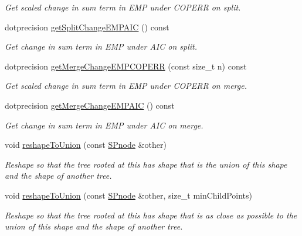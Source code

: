 \begin{DoxyCompactItemize}
\begin{DoxyCompactList}\small\item\em \-Get scaled change in sum term in \-E\-M\-P under \-C\-O\-P\-E\-R\-R on split. \end{DoxyCompactList}\item 
dotprecision \hyperlink{classsubpavings_1_1SPSnode_af75b1acec69e86469838524097fab408}{get\-Split\-Change\-E\-M\-P\-A\-I\-C} () const 
\begin{DoxyCompactList}\small\item\em \-Get change in sum term in \-E\-M\-P under \-A\-I\-C on split. \end{DoxyCompactList}\item 
dotprecision \hyperlink{classsubpavings_1_1SPSnode_a2c8cc31ffdb9c74b82cce176c8d14585}{get\-Merge\-Change\-E\-M\-P\-C\-O\-P\-E\-R\-R} (const size\-\_\-t n) const 
\begin{DoxyCompactList}\small\item\em \-Get scaled change in sum term in \-E\-M\-P under \-C\-O\-P\-E\-R\-R on merge. \end{DoxyCompactList}\item 
dotprecision \hyperlink{classsubpavings_1_1SPSnode_a42114089fcad779bec855496154ded19}{get\-Merge\-Change\-E\-M\-P\-A\-I\-C} () const 
\begin{DoxyCompactList}\small\item\em \-Get change in sum term in \-E\-M\-P under \-A\-I\-C on merge. \end{DoxyCompactList}\item 
void \hyperlink{classsubpavings_1_1SPSnode_ad128b1715d294a65c905579ab43890d2}{reshape\-To\-Union} (const \hyperlink{classsubpavings_1_1SPnode}{\-S\-Pnode} \&other)
\begin{DoxyCompactList}\small\item\em \-Reshape so that the tree rooted at this has shape that is the union of this shape and the shape of another tree. \end{DoxyCompactList}\item 
void \hyperlink{classsubpavings_1_1SPSnode_afe32d323547d5169b03ed9058922ac9d}{reshape\-To\-Union} (const \hyperlink{classsubpavings_1_1SPnode}{\-S\-Pnode} \&other, size\-\_\-t min\-Child\-Points)
\begin{DoxyCompactList}\small\item\em \-Reshape so that the tree rooted at this has shape that is as close as possible to the union of this shape and the shape of another tree. \end{DoxyCompactList}\item 

\end{DoxyCompactItemize}
